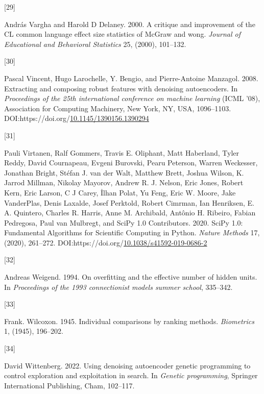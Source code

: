 \documentclass[
  11pt,
]{article}
\newlength{\cslhangindent}
\newlength{\csllabelwidth}
\newlength{\cslentryspacingunit} %
\newenvironment{CSLReferences}[2] %
 {%
  \setlength{\parindent}{0pt}
  \ifodd #1
  \let\oldpar\par
  \def\par{\hangindent=\cslhangindent\oldpar}
  \fi
  \setlength{\parskip}{#2\cslentryspacingunit}
 }%
 {}
\newcommand{\CSLLeftMargin}[1]{\parbox[t]{\csllabelwidth}{#1}}
\newcommand{\CSLRightInline}[1]{\parbox[t]{\linewidth - \csllabelwidth}{#1}\break}
\begin{document}
\begin{CSLReferences}{0}{0}
\leavevmode{}%
\CSLLeftMargin{{[}29{]} }%
\CSLRightInline{András Vargha and Harold D Delaney. 2000. A critique and improvement of the CL common language effect size statistics of McGraw and wong. \emph{Journal of Educational and Behavioral Statistics} 25, (2000), 101--132.}

\leavevmode{}%
\CSLLeftMargin{{[}30{]} }%
\CSLRightInline{Pascal Vincent, Hugo Larochelle, Y. Bengio, and Pierre-Antoine Manzagol. 2008. Extracting and composing robust features with denoising autoencoders. In \emph{Proceedings of the 25th international conference on machine learning} (ICML '08), Association for Computing Machinery, New York, NY, USA, 1096--1103. DOI:https://doi.org/\href{https://doi.org/10.1145/1390156.1390294}{10.1145/1390156.1390294}}

\leavevmode{}%
\CSLLeftMargin{{[}31{]} }%
\CSLRightInline{Pauli Virtanen, Ralf Gommers, Travis E. Oliphant, Matt Haberland, Tyler Reddy, David Cournapeau, Evgeni Burovski, Pearu Peterson, Warren Weckesser, Jonathan Bright, Stéfan J. van der Walt, Matthew Brett, Joshua Wilson, K. Jarrod Millman, Nikolay Mayorov, Andrew R. J. Nelson, Eric Jones, Robert Kern, Eric Larson, C J Carey, İlhan Polat, Yu Feng, Eric W. Moore, Jake VanderPlas, Denis Laxalde, Josef Perktold, Robert Cimrman, Ian Henriksen, E. A. Quintero, Charles R. Harris, Anne M. Archibald, Antônio H. Ribeiro, Fabian Pedregosa, Paul van Mulbregt, and SciPy 1.0 Contributors. 2020. {{SciPy} 1.0: Fundamental Algorithms for Scientific Computing in Python}. \emph{Nature Methods} 17, (2020), 261--272. DOI:https://doi.org/\href{https://doi.org/10.1038/s41592-019-0686-2}{10.1038/s41592-019-0686-2}}

\leavevmode{}%
\CSLLeftMargin{{[}32{]} }%
\CSLRightInline{Andreas Weigend. 1994. On overfitting and the effective number of hidden units. In \emph{Proceedings of the 1993 connectionist models summer school}, 335--342.}

\leavevmode{}%
\CSLLeftMargin{{[}33{]} }%
\CSLRightInline{Frank. Wilcoxon. 1945. Individual comparisons by ranking methods. \emph{Biometrics} 1, (1945), 196--202.}

\leavevmode{}%
\CSLLeftMargin{{[}34{]} }%
\CSLRightInline{David Wittenberg. 2022. Using denoising autoencoder genetic programming to control exploration and exploitation in search. In \emph{Genetic programming}, Springer International Publishing, Cham, 102--117.}


\end{CSLReferences}
\end{document}
